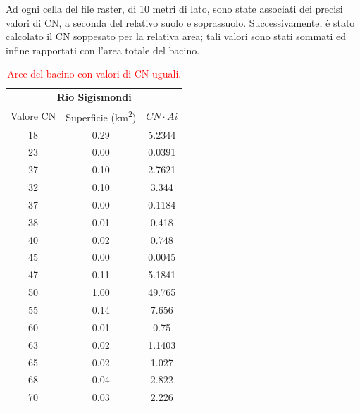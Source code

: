 Ad ogni cella del file raster, di 10 metri di lato, sono state associati dei precisi valori di CN, a seconda del relativo suolo e soprassuolo. Successivamente, è stato calcolato il CN soppesato per la relativa area; tali valori sono stati sommati ed infine rapportati con l'area totale del bacino.
\begin{table}[H] \centering
    \caption{\textcolor{red}{Aree del bacino con valori di CN uguali.}}
    \begin{tabular}{ccc}
        \toprule
    \multicolumn{3}{c}{\textbf{Rio Sigismondi}}  \\
    Valore CN & Superficie (\unit{km^2}) & $CN \cdot Ai$   \\
    \midrule
    18                 & 0.29                           & 5.2344            \\
    23                 & 0.00                           & 0.0391            \\
    27                 & 0.10                           & 2.7621            \\
    32                 & 0.10                           & 3.344             \\
    37                 & 0.00                           & 0.1184            \\
    38                 & 0.01                           & 0.418             \\
    40                 & 0.02                           & 0.748             \\
    45                 & 0.00                           & 0.0045            \\
    47                 & 0.11                           & 5.1841            \\
    50                 & 1.00                           & 49.765            \\
    55                 & 0.14                           & 7.656             \\
    60                 & 0.01                           & 0.75              \\
    63                 & 0.02                           & 1.1403            \\
    65                 & 0.02                           & 1.027             \\
    68                 & 0.04                           & 2.822             \\
    70                 & 0.03                           & 2.226             \\

\end{tabular}
\end{table}
